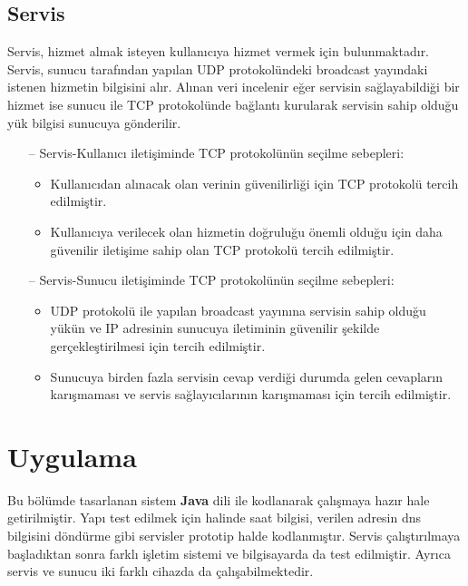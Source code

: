 \documentclass[12pt]{article}
\begin{document}
\begin{justify}
\subsection{Servis}
Servis, hizmet almak isteyen kullanıcıya hizmet vermek için bulunmaktadır. Servis, sunucu tarafından yapılan UDP protokolündeki broadcast yayındaki istenen hizmetin bilgisini alır. Alınan veri incelenir eğer servisin sağlayabildiği bir hizmet ise sunucu ile TCP protokolünde bağlantı kurularak servisin sahip olduğu yük bilgisi sunucuya gönderilir.
\begin{enumerate}
    \item[--] Servis-Kullanıcı iletişiminde TCP protokolünün seçilme sebepleri:
    \begin{itemize}
        \item Kullanıcıdan alınacak olan verinin güvenilirliği için TCP protokolü tercih edilmiştir.
        \item Kullanıcıya verilecek olan hizmetin doğruluğu önemli olduğu için daha güvenilir iletişime sahip olan TCP protokolü tercih edilmiştir.
    \end{itemize}
    \item[--] Servis-Sunucu iletişiminde TCP protokolünün seçilme sebepleri:
    \begin{itemize}
        \item UDP protokolü ile yapılan broadcast yayınına servisin sahip olduğu yükün ve IP adresinin sunucuya iletiminin güvenilir şekilde gerçekleştirilmesi için tercih edilmiştir.
        \item Sunucuya birden fazla servisin cevap verdiği durumda gelen cevapların karışmaması ve servis sağlayıcılarının karışmaması için tercih edilmiştir.
    \end{itemize}
\end{enumerate}


\section{Uygulama}
Bu bölümde tasarlanan sistem \textbf{Java} dili ile kodlanarak çalışmaya hazır hale getirilmiştir. Yapı test edilmek için halinde saat bilgisi, verilen adresin dns bilgisini döndürme gibi servisler prototip halde kodlanmıştır. Servis çalıştırılmaya başladıktan sonra farklı işletim sistemi ve bilgisayarda da test edilmiştir. Ayrıca servis ve sunucu iki farklı cihazda da çalışabilmektedir.


\end{justify}
\end{document}
